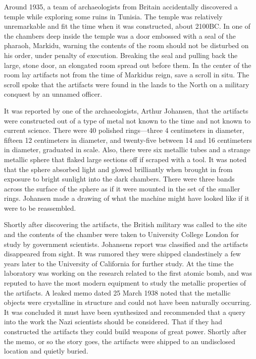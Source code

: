 Around 1935, a team of archaeologists from Britain accidentally
discovered a temple while exploring some ruins in Tunisia. The temple
was relatively unremarkable and fit the time when it was constructed,
about 2100BC. In one of the chambers deep inside the temple was a door
embossed with a seal of the pharaoh, Markidu, warning the contents of
the room should not be disturbed on his order, under penalty of
execution. Breaking the seal and pulling back the large, stone door, an
elongated room spread out before them. In the center of the room lay
artifacts not from the time of Markidu\textquotesingle s reign, save a
scroll in situ. The scroll spoke that the artifacts were found in the
lands to the North on a military conquest by an unnamed officer.

It was reported by one of the archaeologists, Arthur Johansen, that the
artifacts were constructed out of a type of metal not known to the time
and not known to current science. There were 40 polished rings---three 4
centimeters in diameter, fifteen 12 centimeters in diameter, and
twenty-five between 14 and 16 centimeters in diameter, graduated in
scale. Also, there were six metallic tubes and a strange metallic sphere
that flaked large sections off if scraped with a tool. It was noted that
the sphere absorbed light and glowed brilliantly when brought in from
exposure to bright sunlight into the dark chambers. There were three
bands across the surface of the sphere as if it were mounted in the set
of the smaller rings. Johansen made a drawing of what the machine might
have looked like if it were to be reassembled.

Shortly after discovering the artifacts, the British military was called
to the site and the contents of the chamber were taken to University
College London for study by government scientists.
Johansen\textquotesingle s report was classified and the artifacts
disappeared from sight. It was rumored they were shipped clandestinely a
few years later to the University of California for further study. At
the time the laboratory was working on the research related to the first
atomic bomb, and was reputed to have the most modern equipment to study
the metallic properties of the artifacts. A leaked memo dated 25 March
1938 noted that the metallic objects were crystalline in structure and
could not have been naturally occurring. It was concluded it must have
been synthesized and recommended that a query into the work the Nazi
scientists should be considered. That if they had constructed the
artifacts they could build weapons of great power. Shortly after the
memo, or so the story goes, the artifacts were shipped to an undisclosed
location and quietly buried.

